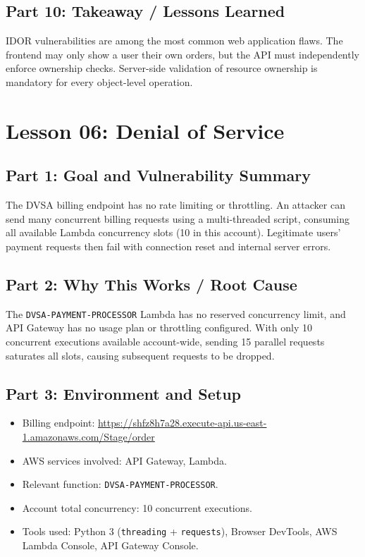 \documentclass[12pt]{report}
\begin{document}
\section{Part 10: Takeaway / Lessons Learned}
IDOR vulnerabilities are among the most common web application flaws. The frontend may only show a user their own orders, but the API must independently enforce ownership checks. Server-side validation of resource ownership is mandatory for every object-level operation.
 
\clearpage
 
\chapter{Lesson 06: Denial of Service}

\section{Part 1: Goal and Vulnerability Summary}
The DVSA billing endpoint has no rate limiting or throttling. An attacker can send many concurrent billing requests using a multi-threaded script, consuming all available Lambda concurrency slots (10 in this account). Legitimate users' payment requests then fail with connection reset and internal server errors.

\section{Part 2: Why This Works / Root Cause}
The \texttt{DVSA-PAYMENT-PROCESSOR} Lambda has no reserved concurrency limit, and API Gateway has no usage plan or throttling configured. With only 10 concurrent executions available account-wide, sending 15 parallel requests saturates all slots, causing subsequent requests to be dropped.

\section{Part 3: Environment and Setup}
\begin{itemize}
  \item Billing endpoint: \url{https://shfz8h7a28.execute-api.us-east-1.amazonaws.com/Stage/order}
  \item AWS services involved: API Gateway, Lambda.
  \item Relevant function: \texttt{DVSA-PAYMENT-PROCESSOR}.
  \item Account total concurrency: 10 concurrent executions.
  \item Tools used: Python 3 (\texttt{threading} + \texttt{requests}), Browser DevTools, AWS Lambda Console, API Gateway Console.
\end{itemize}
\end{document}
